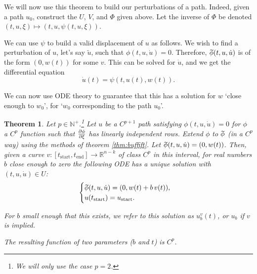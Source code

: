 \documentclass{article}
\theoremstyle{plain}
\newtheorem{theorem}{Theorem}
\theoremstyle{plain}
\theoremstyle{nonumberplain}
\theoremstyle{empty}
\newcommand{\R}{\mathbb{R}}
\newcommand{\N}{\mathbb{N}}
\newcommand{\tstart}{\mathrm{start}}
\newcommand{\tend}{\mathrm{end}}
\newcommand{\wtphi}{
  \mspace{2mu}
  \widetilde{\mspace{-2mu}\smash[t]{\phi}}
}
\begin{document}
We will now use this theorem to build our perturbations of a path. Indeed, given a path $u_0$, construct the $U$, $V$, and $\Phi$ given above. Let the inverse of $\Phi$ be denoted $(t,u,\xi) \mapsto (t,u,\psi(t,u,\xi))$.

We can use $\psi$ to build a valid displacement of $u$ as follows. We wish to find a perturbation of $u$, let's say $\tilde u$, such that $\phi(t,u,\dot u) = 0$. Therefore, $\wtphi(t,u,\dot u)$ is of the form $(0,w(t))$ for some $v$. This can be solved for $\dot u$, and we get the differential equation
\[\dot u(t) = \psi(t,u(t),w(t)).\]

We can now use ODE theory to guarantee that this has a solution for $w$ `close enough to $w_0$', for `$w_0$ corresponding to the path $u_0$'.

\begin{theorem}\label{thm:perturbation}
Let $p \in \N^+$.\footnote{We will only use the case $p = 2$.} Let $u$ be a $C^{p+1}$ path satisfying $\phi(t,u,\dot u) = 0$ for $\phi$ a $C^p$ function such that $\diffp \phi \xi$ has linearly independent rows. Extend $\phi$ to $\wtphi$ (in a $C^p$ way) using the methods of theorem \ref{thm:buffift}. Let $\wtphi(t,u,\dot u) = (0, w(t))$. Then, given a curve $v : [t_\tstart, t_\tend] \to \R^{n-k}$ of class $C^p$ in this interval, for real numbers $b$ close enough to zero the following ODE has a unique solution with $(t,u,\dot u) \in U$:
\[
\begin{cases}
\wtphi(t, u, \dot u) = (0, w(t) + b\,v(t)),\\
u(t_\tstart) = u_\tstart.
\end{cases}
\]

For $b$ small enough that this exists, we refer to this solution as $u_b^v(t)$, or $u_b$ if $v$ is implied.

The resulting function of two parameters ($b$ and $t$) is $C^p$.
\end{theorem}
\end{document}
